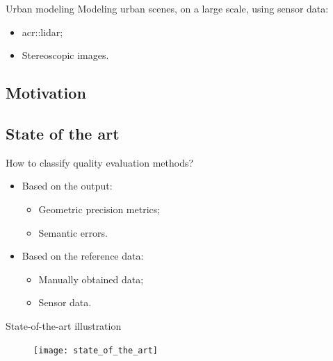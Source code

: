 \documentclass[export]{beamer}
\begin{document}
            \begin{frame}{Urban modeling}
                Modeling urban scenes, on a large scale, using sensor data:
                \begin{itemize}[label=$\blacktriangleright$, font=\color{IGNGreen}]
                    \item \acrfull{acr::lidar};
                    \item Stereoscopic images.
                \end{itemize}
            \end{frame}
        \subsection{Motivation}
        \subsection{State of the art}
            \begin{frame}{How to classify quality evaluation methods?}
                \begin{itemize}[
                        label=$\blacktriangleright$,
                        font=\color{IGNGreen},
                        itemsep=2em
                    ]
                    \item<1-> Based on the output:
                    \begin{itemize}[label=--, itemsep=1em]
                        \item<2-> Geometric precision metrics;
                        \item<2-> Semantic errors.
                    \end{itemize}
                    \item<3-> Based on the reference data:
                    \begin{itemize}[label=--, itemsep=1em]
                        \item<4-> Manually obtained data;
                        \item<4-> Sensor data.
                    \end{itemize}
                \end{itemize}
            \end{frame}
            \begin{frame}[plain]{State-of-the-art illustration}
                \begin{figure}
                    \texttt{[image: state\_of\_the\_art]}
                \end{figure}
            \end{frame}
\end{document}
